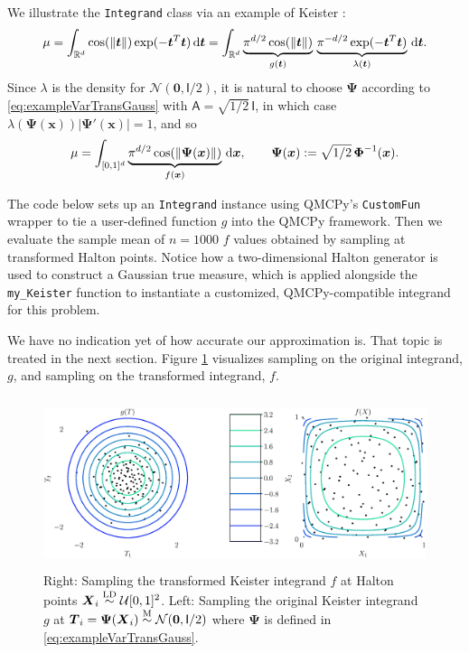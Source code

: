 \documentclass[graybox]{svmult}
\begin{document}
We illustrate the \texttt{Integrand} class via an example of Keister \cite{Kei96}:
\begin{equation} \label{eq:KeisterIntegral}
	\mu 
	= \int_{\mathbb{R}^d} \cos(\lVert \boldsymbol{t} \rVert) \exp(-\boldsymbol{t}^T \boldsymbol{t}) \, \D \boldsymbol{t} \\ 
	= \int_{\mathbb{R}^d} \underbrace{\pi^{d/2} \cos(\lVert \boldsymbol{t} \rVert)}_{g(\boldsymbol{t})}\, \underbrace{\pi^{-d/2} \exp(-\boldsymbol{t}^T \boldsymbol{t}) }_{\lambda(\boldsymbol{t})} \, \D \boldsymbol{t}.
\end{equation}
Since $\lambda$ is the density for $\mathcal{N}(\boldsymbol{0},\mathsf{I}/2)$, it is natural to choose $\boldsymbol{\Psi}$ according to \eqref{eq:exampleVarTransGauss} with $\mathsf{A} = \sqrt{1/2} \, \mathsf{I}$, in which case $\lambda(\boldsymbol{\Psi}(\boldsymbol{x})) \lvert \boldsymbol{\Psi}'(\boldsymbol{x})\rvert  = 1$, and so 
\[
\mu = \int_{[0,1]^d} \underbrace{\pi^{d/2} \cos(\lVert \boldsymbol{\Psi}(\boldsymbol{x}) \rVert)}_{f(\boldsymbol{x})} \, \mathrm{d} \boldsymbol{x}, \qquad 
\boldsymbol{\Psi}(\boldsymbol{x}) := \sqrt{1/2} \,\boldsymbol{\Phi}^{-1}(\boldsymbol{x}).
\]

The code below sets up an \texttt{Integrand} instance using QMCPy's \texttt{CustomFun} wrapper to tie a user-defined function $g$ into the QMCPy framework.  Then we evaluate the sample mean of $n=1000$ $f$ values obtained by sampling at transformed Halton points. Notice how a two-dimensional Halton generator is used to construct a Gaussian true measure, which is applied alongside the \texttt{my\_Keister} function to instantiate a customized, QMCPy-compatible integrand for this problem.

We have no indication yet of how accurate our approximation is.  That topic is treated in the next section.  Figure \ref{fig:ikc} visualizes sampling on the original integrand, $g$, and sampling on the transformed integrand, $f$. 

\begin{figure}[t]
	\includegraphics[height=5cm]{QMCSoftwareArticle/vfigs/i_keister_contours.eps}
	\caption{Right: Sampling the transformed Keister integrand $f$ at Halton points $\boldsymbol{X}_i \overset{\textup{LD}}{\sim} \mathcal{U}[0,1]^2$. Left: Sampling the original Keister integrand $g$ at $\boldsymbol{T}_i = \boldsymbol{\Psi}(\boldsymbol{X}_i) \overset{\textup{M}}{\sim} \mathcal{N}(\boldsymbol{0},\mathsf{I}/2)$ where $\boldsymbol{\Psi}$ is defined in \eqref{eq:exampleVarTransGauss}.  } \label{fig:ikc}
\end{figure}
\end{document}
